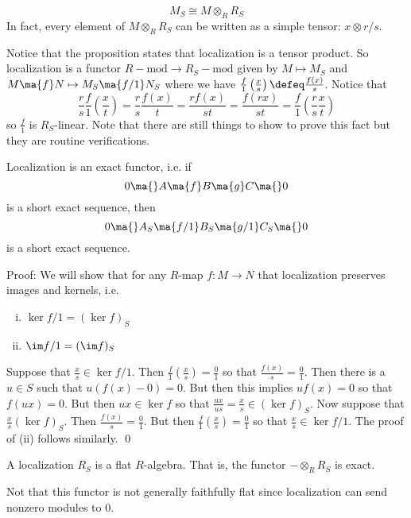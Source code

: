 \begin{prop}
\[
M_S \cong M \otimes_R R_S
\]
In fact, every element of $M \otimes_R R_S$ can be written as a simple tensor: $x \otimes r/s$.
\end{prop}

Notice that the proposition states that localization is a tensor product. So localization is a functor $R-\text{mod} \to R_S-\text{mod}$ given by $M \mapsto M_S$ and $M\ma{f} N \mapsto M_S \ma{f/1} N_S$ where we have $\frac{f}{1}\left(\frac{x}{s}\right) \defeq \frac{f(x)}{s}$. Notice that
\[
\frac{r}{s} \frac{f}{1}\left(\frac{x}{t}\right) = \frac{r}{s} \frac{f(x)}{t}=\frac{rf(x)}{st}=\frac{f(rx)}{st}=\frac{f}{1} \left( \frac{r}{s} \frac{x}{t} \right)
\]
so $\frac{f}{1}$ is $R_S$-linear. Note that there are still things to show to prove this fact but they are routine verifications. 

\begin{prop}
Localization is an exact functor, i.e. if 
\[
0 \ma{} A \ma{f} B \ma{g} C \ma{} 0
\]
is a short exact sequence, then
\[
0 \ma{} A_S \ma{f/1} B_S \ma{g/1} C_S \ma{} 0
\]
is a short exact sequence.
\end{prop}

\noindent Proof: We will show that for any $R$-map $f: M \to N$ that localization preserves images and kernels, i.e.
\begin{enumerate}[(i)]
\item $\ker f/1=(\ker f)_S$ \\
\item $\im f/1=(\im f)_S$
\end{enumerate}

Suppose that $\frac{x}{s} \in \ker f/1$. Then $\frac{f}{1}\left(\frac{x}{s}\right)=\frac{0}{1}$ so that $\frac{f(x)}{s}=\frac{0}{1}$. Then there is a $u \in S$ such that $u(f(x)-0)=0$. But then this implies $uf(x)=0$ so that $f(ux)=0$. But then $ux \in \ker f$ so that $\frac{ux}{us}=\frac{x}{s} \in (\ker f)_S$. Now suppose that $\frac{x}{s} (\ker f)_S$. Then $\frac{f(x)}{s}=\frac{0}{1}$. But then $\frac{f}{1}\left(\frac{x}{s}\right)=\frac{0}{1}$ so that $\frac{x}{s} \in \ker f/1$. The proof of (ii) follows similarly. \qed \\

\begin{cor}
A localization $R_S$ is a flat $R$-algebra. That is, the functor $- \otimes_R R_S$ is exact. 
\end{cor}

Not that this functor is not generally faithfully flat since localization can send nonzero modules to 0. 